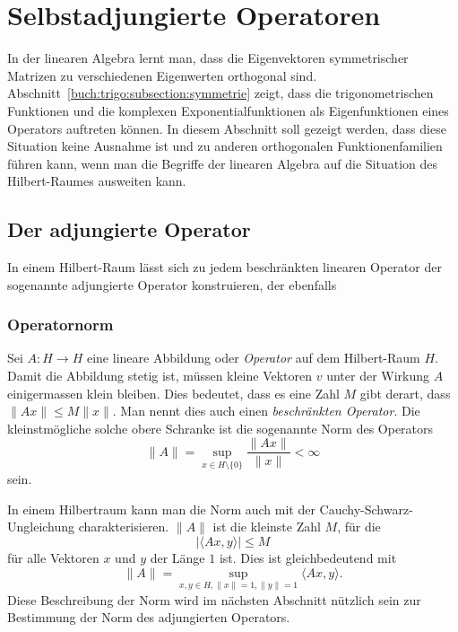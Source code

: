 %
%
%
\section{Selbstadjungierte Operatoren
\label{buch:orthofkt:section:sa}}
In der linearen Algebra lernt man, dass die Eigenvektoren
symmetrischer Matrizen zu verschiedenen Eigenwerten orthogonal
sind.
Abschnitt~\ref{buch:trigo:subsection:symmetrie}
zeigt, dass die trigonometrischen Funktionen und die
komplexen Exponentialfunktionen als Eigenfunktionen eines
Operators auftreten können.
In diesem Abschnitt soll gezeigt werden, dass diese Situation
keine Ausnahme ist und zu anderen orthogonalen Funktionenfamilien
führen kann, wenn man die Begriffe der linearen Algebra auf
die Situation des Hilbert-Raumes ausweiten kann.

%
%
\subsection{Der adjungierte Operator}
In einem Hilbert-Raum lässt sich zu jedem beschränkten linearen
Operator der sogenannte adjungierte Operator konstruieren, der
ebenfalls 

%
%
\subsubsection{Operatornorm}
Sei $A:H\to H$ eine lineare Abbildung oder {\em Operator} auf dem
Hilbert-Raum $H$.
Damit die Abbildung stetig ist, müssen kleine Vektoren $v$ unter der
Wirkung $A$ einigermassen klein bleiben.
Dies bedeutet, dass es eine Zahl $M$ gibt derart, dass $\|Ax\| \le M\|x\|$.
Man nennt dies auch einen {\em beschränkten Operator}.
%
Die kleinstmögliche solche obere Schranke ist
die sogenannte Norm des Operators
\[
\|A\|
=
\sup_{x\in H\setminus\{0\}} \frac{\|Ax\|}{\|x\|}
<
\infty
\]
sein.

In einem Hilbertraum kann man die Norm auch mit der Cauchy-Schwarz-Ungleichung
charakterisieren.
$\|A\|$ ist die kleinste Zahl $M$, für die 
\begin{equation}
|\langle Ax,y\rangle| \le M
\label{buch:orthofkt:sa:eqn:normcauchyschwarz}
\end{equation}
für alle Vektoren $x$ und $y$ der Länge $1$ ist.
Dies ist gleichbedeutend mit
\begin{equation}
\|A\|
=
\sup_{x,y\in H, \|x\|=1, \|y\|=1}
\langle Ax,y\rangle.
\label{buch:orthofkt:sa:eqn:normcauchyschwarzsup}
\end{equation}
Diese Beschreibung der Norm wird im nächsten Abschnitt nützlich sein zur
Bestimmung der Norm des adjungierten Operators.


